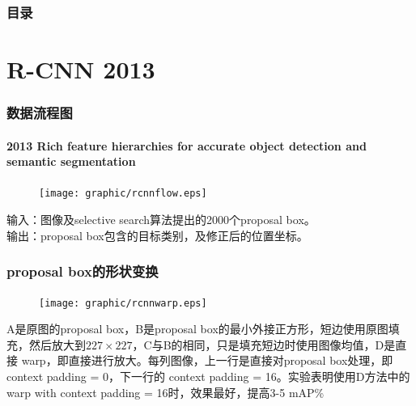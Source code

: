 \documentclass{beamer}
\date{2017 11}
\begin{document}

\begin{frame}
    \frametitle{目录}
    \tableofcontents
\end{frame}


\section{R-CNN 2013}

\begin{frame}
    \frametitle{数据流程图}
    \framesubtitle{2013 Rich feature hierarchies for accurate object detection and semantic segmentation}
    \begin{figure}
        \centering
        \texttt{[image: graphic/rcnnflow.eps]}
    \end{figure}
    输入：图像及selective search算法提出的2000个proposal box。  \\
    输出：proposal box包含的目标类别，及修正后的位置坐标。  \\
\end{frame}

\begin{frame}
    \frametitle{proposal box的形状变换}
    \begin{figure}
        \centering
        \texttt{[image: graphic/rcnnwarp.eps]}
    \end{figure}
    \scriptsize{A是原图的proposal box，B是proposal box的最小外接正方形，短边使用原图填充，然后放大到$227\times 227$，C与B的相同，只是填充短边时使用图像均值，D是直接 warp，即直接进行放大。每列图像，上一行是直接对proposal box处理，即 context padding = 0，下一行的 context padding = 16。实验表明使用D方法中的 warp with context padding = 16时，效果最好，提高3-5 mAP\%}
\end{frame}
\end{document}
